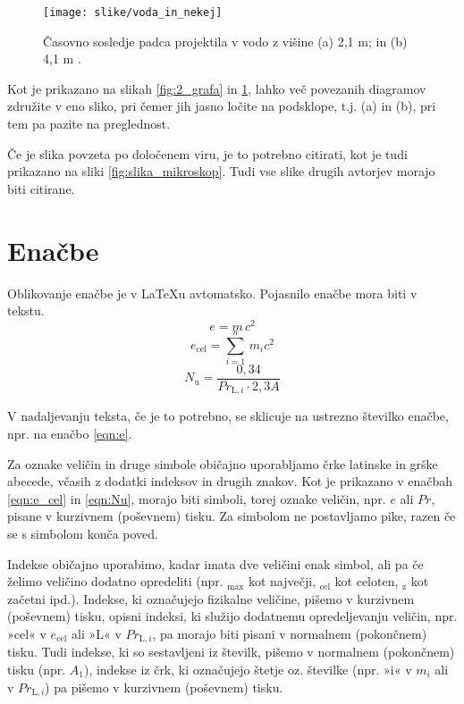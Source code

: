 \begin{figure}[ht!]
\begin{centering}
  \texttt{[image: slike/voda\_in\_nekej]}
  \caption{Časovno sosledje padca projektila v vodo z višine (a) 2,1 m; in (b) 4,1 m \cite{Gonzalez_2014}.} \label{fig:voda_in_nekej}
\end{centering}
\end{figure}

Kot je prikazano na slikah \ref{fig:2_grafa} in \ref{fig:voda_in_nekej}, lahko več povezanih diagramov združite v eno sliko, pri čemer jih jasno ločite na podsklope, t.j. (a) in (b), pri tem pa pazite na preglednost.

Če je slika povzeta po določenem viru, je to potrebno citirati, kot je tudi prikazano na sliki \ref{fig:slika_mikroskop}. Tudi vse slike drugih avtorjev morajo biti citirane.

\section{Enačbe}\label{sec:enacbe}

Oblikovanje enačbe je v \LaTeX u avtomatsko. Pojasnilo enačbe mora biti v tekstu.
\begin{equation}\label{eqn:e}
e = m\,c^2
\end{equation}
\begin{equation}\label{eqn:e_cel}
e_{\text{cel}}=\sum_{i=1}^{n}\,m_{i}c^2
\end{equation}
\begin{equation}\label{eqn:Nu}
N_{\text{u}} = \frac{0{,}34}{Pr_{\text{L},i}\cdot 2{,}3A}
\end{equation}

V nadaljevanju teksta, če je to potrebno, se sklicuje na ustrezno številko enačbe, npr. na enačbo \eqref{eqn:e}.

Za oznake veličin in druge simbole običajno uporabljamo črke latinske in grške abecede, včasih z dodatki indeksov in drugih znakov. Kot je prikazano v enačbah \eqref{eqn:e_cel} in \eqref{eqn:Nu}, morajo biti simboli, torej oznake veličin, npr. $e$ ali $Pr$, pisane v kurzivnem (poševnem) tisku. Za simbolom ne postavljamo pike, razen če se s simbolom konča poved.

Indekse običajno uporabimo, kadar imata dve veličini enak simbol, ali pa če želimo veličino dodatno opredeliti (npr. $_{\text{max}}$ kot največji, $_{\text{cel}}$ kot celoten, $_{\text{z}}$ kot začetni ipd.). Indekse, ki označujejo fizikalne veličine, pišemo v kurzivnem (poševnem) tisku, opisni indeksi, ki služijo dodatnemu opredeljevanju veličin, npr. »cel« v $e_{\text{cel}}$ ali »L« v $Pr_{\text{L},i}$, pa morajo biti pisani v normalnem (pokončnem) tisku. Tudi indekse, ki so sestavljeni iz številk, pišemo v normalnem (pokončnem) tisku (npr. $A_1$), indekse iz črk, ki označujejo štetje oz. številke (npr. »i« v $m_i$ ali v $Pr_{\text{L},i}$) pa pišemo v kurzivnem (poševnem) tisku.


